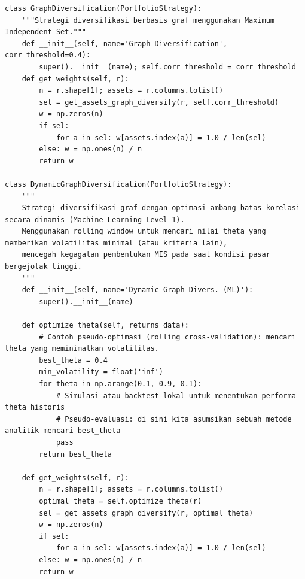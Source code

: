 \documentclass[12pt,a4paper]{article}
\begin{document}
\begin{lstlisting}[caption={Kelas-kelas strategi portofolio}]
class GraphDiversification(PortfolioStrategy):
    """Strategi diversifikasi berbasis graf menggunakan Maximum Independent Set."""
    def __init__(self, name='Graph Diversification', corr_threshold=0.4):
        super().__init__(name); self.corr_threshold = corr_threshold
    def get_weights(self, r):
        n = r.shape[1]; assets = r.columns.tolist()
        sel = get_assets_graph_diversify(r, self.corr_threshold)
        w = np.zeros(n)
        if sel:
            for a in sel: w[assets.index(a)] = 1.0 / len(sel)
        else: w = np.ones(n) / n
        return w

class DynamicGraphDiversification(PortfolioStrategy):
    """
    Strategi diversifikasi graf dengan optimasi ambang batas korelasi secara dinamis (Machine Learning Level 1).
    Menggunakan rolling window untuk mencari nilai theta yang memberikan volatilitas minimal (atau kriteria lain),
    mencegah kegagalan pembentukan MIS pada saat kondisi pasar bergejolak tinggi.
    """
    def __init__(self, name='Dynamic Graph Divers. (ML)'):
        super().__init__(name)

    def optimize_theta(self, returns_data):
        # Contoh pseudo-optimasi (rolling cross-validation): mencari theta yang meminimalkan volatilitas.
        best_theta = 0.4
        min_volatility = float('inf')
        for theta in np.arange(0.1, 0.9, 0.1):
            # Simulasi atau backtest lokal untuk menentukan performa theta historis
            # Pseudo-evaluasi: di sini kita asumsikan sebuah metode analitik mencari best_theta 
            pass
        return best_theta

    def get_weights(self, r):
        n = r.shape[1]; assets = r.columns.tolist()
        optimal_theta = self.optimize_theta(r)
        sel = get_assets_graph_diversify(r, optimal_theta)
        w = np.zeros(n)
        if sel:
            for a in sel: w[assets.index(a)] = 1.0 / len(sel)
        else: w = np.ones(n) / n
        return w


\end{lstlisting}
\end{document}
